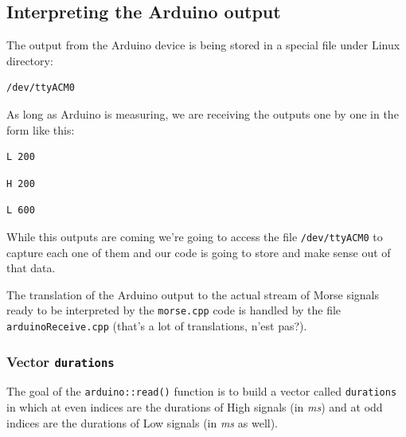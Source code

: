 \documentclass[12pt]{report}
\begin{document}
\subsection{Interpreting the Arduino output}

The output from the Arduino device is being stored in a special file under Linux directory:

\begin{snugshade}
\begin{verbatim}
/dev/ttyACM0
\end{verbatim}
\end{snugshade}

As long as Arduino is measuring, we are receiving the outputs one by one in the form like this:

\begin{snugshade}
\begin{verbatim}
L 200
\end{verbatim}
\end{snugshade}

\begin{snugshade}
\begin{verbatim}
H 200
\end{verbatim}
\end{snugshade}

\begin{snugshade}
\begin{verbatim}
L 600
\end{verbatim}
\end{snugshade}

While this outputs are coming we're going to access the file \texttt{/dev/ttyACM0} to capture each one of them and our code is going to store and make sense out of that data.

The translation of the Arduino output to the actual stream of Morse signals ready to be interpreted by the \texttt{morse.cpp} code is handled by the file \texttt{arduinoReceive.cpp} (that's a lot of translations, n'est pas?).

\subsubsection{Vector \texttt{durations}}

The goal of the \texttt{arduino::read()} function is to build a vector called \texttt{durations} in which at even indices are the durations of High signals (in \textit{ms}) and at odd indices are the durations of Low signals (in \textit{ms} as well).
\end{document}
